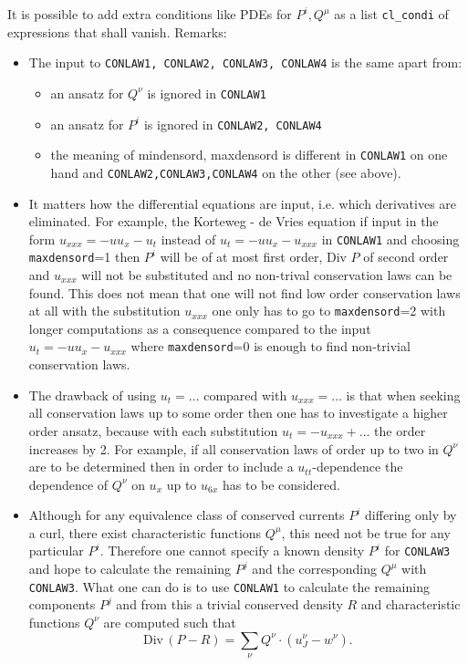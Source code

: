 \documentclass[12pt]{article}
\begin{document}
It is possible to add extra conditions like PDEs for $P^i, Q^{\mu}$ as a list 
{\tt cl\_condi} of expressions that shall vanish. \hspace{6pt}
\noindent Remarks: 
\begin{itemize}
\item The input to {\tt CONLAW1, CONLAW2, CONLAW3, CONLAW4} is the 
same apart from:
\begin{itemize}
\item an ansatz for $Q^{\nu}$ is ignored in {\tt CONLAW1}
\item an ansatz for $P^i$ is ignored in {\tt CONLAW2, CONLAW4}
\item the meaning of mindensord, maxdensord is different in {\tt CONLAW1} 
on one hand and {\tt CONLAW2,CONLAW3,CONLAW4} on the other (see above).
\end{itemize}

\item
It matters how the differential equations are input, i.e. which
derivatives are eliminated. For example, the Korteweg - de Vries
equation if input in the form $u_{xxx}=-uu_x-u_t$ instead of
$u_t=-uu_x-u_{xxx}$
in {\tt CONLAW1} and choosing {\tt maxdensord}=1 then
$P^i$ will be of at most first order, Div $P$ of second order and $u_{xxx}$
will not be substituted and no non-trival conservation laws can be found.
This does not mean that one will not find low order conservation laws at
all with the substitution $u_{xxx}$ one only has to go to 
{\tt maxdensord}=2 with longer computations as a consequence compared to the 
input $u_t=-uu_x-u_{xxx}$ where {\tt maxdensord}=0 is enough to find 
non-trivial conservation laws.

\item The drawback of using $u_t=\ldots$ compared with $u_{xxx}=\ldots$
is that when seeking all conservation laws up to some order
then one has to investigate a higher order ansatz, because with each
substitution $u_t=-u_{xxx}+\ldots$ the order increases by 2.
For example, if all conservation laws of order up to two in $Q^{\nu}$ 
are to be determined then in order to include a $u_{tt}$-dependence the 
dependence of $Q^{\nu}$ on $u_x$ up to $u_{6x}$ has to be considered.

\item Although for any equivalence class of conserved currents $P^i$
differing only by a curl, there exist characteristic functions $Q^{\mu}$,
this need not be true for any particular $P^i$.
Therefore one cannot specify a known density $P^i$ for {\tt CONLAW3}
and hope to calculate the remaining $P^j$ and the corresponding $Q^{\mu}$
with {\tt CONLAW3}. What one
can do is to use {\tt CONLAW1} to calculate the remaining components 
$P^j$ and from this a trivial conserved
density $R$ and characteristic functions $Q^{\nu}$ are computed such that
\[ \mbox{Div}\,(P-R) = \sum_{\nu} Q^{\nu}\cdot (u^{\nu}_J - w^{\nu}). \]


\end{itemize}
\end{document}
